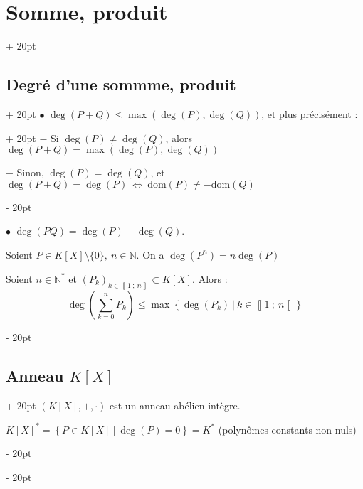 \documentclass[a4paper, 12pt, twoside]{article}
\newcommand{\N}{\mathbb{N}} %
\newcommand{\nset}[2]{\left\llbracket #1\ ;\ #2 \right\rrbracket}
\newcommand{\ssi}{\ \Leftrightarrow \ }
\newcommand{\lr}[1]{\left( #1 \right)}
\newcommand{\set}[1]{\left\{ #1 \right\}}
\renewcommand{\le}{\leqslant}
\newcommand{\dom}{\mathrm{dom}}
\newcommand{\ind}[1][20pt]{\advance\leftskip + #1}
\newcommand{\deind}[1][20pt]{\advance\leftskip - #1}
\newenvironment{indt}[2][20pt]{#2 \par \ind[#1]}{\par \deind} %
\begin{document}
\begin{indt}{\section{Somme, produit}}
\begin{indt}{\subsection{Degré d'une sommme, produit}}
            \begin{indt}{$\bullet$ $\deg(P + Q) \le \max(\deg(P), \deg(Q))$, et plus précisément :}
                $-$ Si $\deg(P) \neq \deg(Q)$, alors $\deg(P + Q) = \max(\deg(P), \deg(Q))$
                
                $-$ Sinon, $\deg(P) = \deg(Q)$, et $\deg(P + Q) = \deg(P) \ssi \dom(P) \neq - \dom(Q)$
            \end{indt}
            
            \vspace{6pt}
            
            $\bullet$ $\deg(PQ) = \deg(P) + \deg(Q)$.
            
            \vspace{12pt}
            
            Soient $P \in K[X] \setminus \{0\},\ n \in \N$. On a $\deg(P^n) = n\deg(P)$
            
            \vspace{12pt}
            
            Soient $n \in \N^*$ et $(P_k)_{k \in \nset{1}{n}} \subset K[X]$. Alors :
                \[ \deg\lr{\sum_{k = 0}^n P_k} \le \max\set{\deg(P_k)\ |\ k \in \nset 1 n} \]
        \end{indt}
        
        \vspace{12pt}
        
        \begin{indt}{\subsection{Anneau $K[X]$}}
            $(K[X], +, \cdot)$ est un anneau abélien intègre.
            
            $K[X]^* = \set{P \in K[X]\ |\ \deg(P) = 0} = K^*$ (polynômes constants non nuls)
        \end{indt}
        
    \end{indt}
    
    \vspace{12pt}
    
\end{document}
